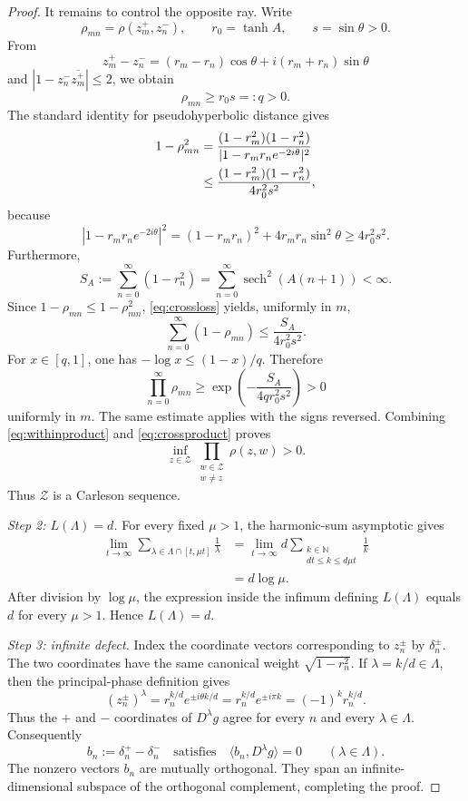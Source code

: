 \documentclass[11pt]{article}
\theoremstyle{definition}
\newcommand{\N}{\mathbb N}
\newcommand{\Zcal}{\mathcal Z}
\newcommand{\Lam}{\Lambda}
\newcommand{\rhoh}{\rho}
\begin{document}
\begin{proof}
It remains to control the opposite ray.  Write
\[
 \rho_{mn}=\rhoh(z_m^+,z_n^-),\qquad
 r_0=\tanh A,\qquad s=\sin\theta>0.
\]
From
\[
 z_m^+-z_n^-=(r_m-r_n)\cos\theta
             +i(r_m+r_n)\sin\theta
\]
and \(|1-z_n^-\overline{z_m^+}|\le2\), we obtain
\begin{equation}\label{eq:q}
 \rho_{mn}\ge r_0s=:q>0.
\end{equation}
The standard identity for pseudohyperbolic distance gives
\begin{align}
 1-\rho_{mn}^2
 &=\frac{(1-r_m^2)(1-r_n^2)}
 {|1-r_mr_ne^{-2i\theta}|^2} \notag\\
 &\le
 \frac{(1-r_m^2)(1-r_n^2)}{4r_0^2s^2},
                                                        \label{eq:crossloss}
\end{align}
because
\[
 |1-r_mr_ne^{-2i\theta}|^2
 =(1-r_mr_n)^2+4r_mr_n\sin^2\theta
 \ge4r_0^2s^2.
\]
Furthermore,
\[
 S_A:=\sum_{n=0}^{\infty}(1-r_n^2)
 =\sum_{n=0}^{\infty}\operatorname{sech}^2(A(n+1))<\infty.
\]
Since \(1-\rho_{mn}\le1-\rho_{mn}^2\), \eqref{eq:crossloss} yields,
uniformly in \(m\),
\[
 \sum_{n=0}^{\infty}(1-\rho_{mn})
 \le\frac{S_A}{4r_0^2s^2}.
\]
For \(x\in[q,1]\), one has
\(-\log x\le(1-x)/q\).  Therefore
\begin{equation}\label{eq:crossproduct}
 \prod_{n=0}^{\infty}\rho_{mn}
 \ge
 \exp\left(-\frac{S_A}{4qr_0^2s^2}\right)>0
\end{equation}
uniformly in \(m\).  The same estimate applies with the signs reversed.
Combining \eqref{eq:withinproduct} and \eqref{eq:crossproduct} proves
\[
 \inf_{z\in\Zcal}\prod_{\substack{w\in\Zcal\\w\ne z}}
 \rhoh(z,w)>0.
\]
Thus \(\Zcal\) is a Carleson sequence.

\medskip
\noindent\emph{Step 2: \(L(\Lam)=d\).}
For every fixed \(\mu>1\), the harmonic-sum asymptotic gives
\begin{align*}
 \lim_{t\to\infty}
 \sum_{\lambda\in\Lam\cap[t,\mu t]}\frac1\lambda
 &=
 \lim_{t\to\infty}
 d\sum_{\substack{k\in\N\\dt\le k\le d\mu t}}\frac1k\\
 &=d\log\mu.
\end{align*}
After division by \(\log\mu\), the expression inside the infimum defining
\(L(\Lam)\) equals \(d\) for every \(\mu>1\).  Hence \(L(\Lam)=d\).

\medskip
\noindent\emph{Step 3: infinite defect.}
Index the coordinate vectors corresponding to \(z_n^\pm\) by
\(\delta_n^\pm\).  The two coordinates have the same canonical weight
\(\sqrt{1-r_n^2}\).  If \(\lambda=k/d\in\Lam\), then the principal-phase
definition gives
\[
 (z_n^\pm)^\lambda
 =r_n^{k/d}e^{\pm i\theta k/d}
 =r_n^{k/d}e^{\pm i\pi k}
 =(-1)^k r_n^{k/d}.
\]
Thus the \(+\) and \(-\) coordinates of \(D^\lambda g\) agree for every
\(n\) and every \(\lambda\in\Lam\).  Consequently
\[
 b_n:=\delta_n^+-\delta_n^-
 \quad\text{satisfies}\quad
 \langle b_n,D^\lambda g\rangle=0
 \qquad(\lambda\in\Lam).
\]
The nonzero vectors \(b_n\) are mutually orthogonal.  They span an
infinite-dimensional subspace of the orthogonal complement, completing the
proof.
\end{proof}
\end{document}
